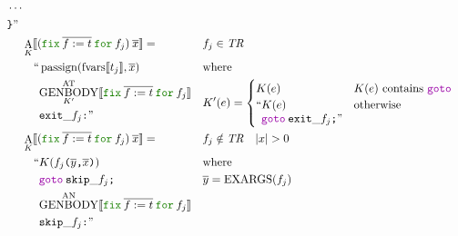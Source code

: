 \documentclass[a4paper,fleqn]{article}
\newcommand{\kwfix}{\mbox{\color{mygreen}\ttfamily fix}}
\newcommand{\kwfor}{\mbox{\color{mygreen}\ttfamily for}}
\newcommand{\ofix}[2]{\kwfix\:{#1}\:\kwfor\:{#2}}
\DeclareMathOperator{\EXARGS}{EXARGS}
\newcommand{\BRA}[1]{\llbracket #1 \rrbracket}
\DeclareMathOperator{\genbody}{GENBODY}
\newcommand{\genbodyat}[2]{\genbody^\mathrm{AT}_{#1}\BRA{#2}}
\newcommand{\genbodyan}[1]{\genbody^\mathrm{AN}\BRA{#1}}
\newcommand{\tr}{\mathit{TR}}
\newcommand{\ldq}{\text{``}}
\newcommand{\rdq}{\text{''}}
\newcommand{\ttparen}[1]{\texttt{(}#1\texttt{)}}
\newcommand{\ttrbrace}{\texttt{\char '175}}
\newcommand{\ttsemi}{\texttt{;}}
\newcommand{\ttcomma}{\texttt{,}}
\newcommand{\ttcolon}{\texttt{:}}
\newcommand{\kwgoto}{\mbox{\color{myviolet}\ttfamily goto}}
\DeclareMathOperator{\passign}{passign}
\DeclareMathOperator{\fvarsop}{fvars}
\newcommand{\fvars}[1]{\fvarsop\BRA{#1}}
\DeclareMathOperator{\Aop}{A}
\newcommand{\A}[2]{\Aop_{#1}\BRA{#2}}
\newcommand{\rep}[1]{\overline{#1}}
\begin{document}
\begin{align*}
\begin{alignedat}{2}
            & \cdots \\
            & \ttrbrace\rdq
       \end{alignedat} \\
  &\A{K}{(\ofix{\rep{f:=t}}{f_j})\:\rep{x}} =                   && f_j \in \tr \\
     & \quad\begin{alignedat}[t]{2}
       \ldq & \passign(\fvars{t_j}, \rep{x}) \\
            & {\genbodyat{K'}{\ofix{\rep{f:=t}}{f_j}}} \\
            & \mathtt{exit\_}f_j\ttcolon \rdq
       \end{alignedat} &&
               \begin{alignedat}[t]{1}
                  & \text{where} \\
                  & K'(e) =
                    \begin{cases}
                    K(e) & \text{$K(e)$ contains \kwgoto}  \\
                    \begin{aligned}[t]
                      \ldq & K(e) \\
                           & \kwgoto\:\mathtt{exit\_}f_j\ttsemi \rdq
                    \end{aligned} & \text{otherwise}
                  \end{cases}
                \end{alignedat} \\
  &\A{K}{(\ofix{\rep{f:=t}}{f_j})\:\rep{x}} =                      && f_j \notin \tr \quad |x| > 0 \\
     & \quad\begin{alignedat}[t]{2}
       \ldq & K(f_j\ttparen{\rep{y}\ttcomma \rep{x}})                  \\
            & \kwgoto\:\mathtt{skip\_}f_j\ttsemi                                    \\
            & {\genbodyan{\ofix{\rep{f:=t}}{f_j}}}                          \\
            & \mathtt{skip\_}f_j\ttcolon \rdq
       \end{alignedat} &&
               \begin{alignedat}[t]{1}
                  & \text{where} \\
                  & \rep{y} = \EXARGS(f_j)
               \end{alignedat}
\end{align*}
\end{document}
